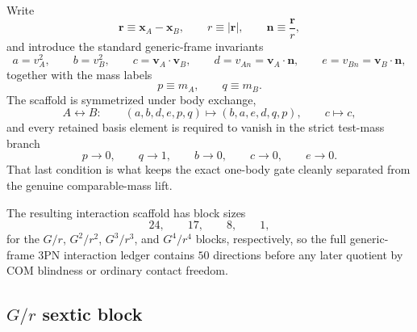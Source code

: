 \documentclass[11pt]{article}
\begin{document}
Write
\begin{equation}
\mathbf r\equiv \mathbf x_A-\mathbf x_B,
\qquad
r\equiv |\mathbf r|,
\qquad
\mathbf n\equiv \frac{\mathbf r}{r},
\label{eq:app-generic-scaffold-rn}
\end{equation}
and introduce the standard generic-frame invariants
\begin{equation}
 a=v_A^2,
 \qquad
 b=v_B^2,
 \qquad
 c=\mathbf v_A\!\cdot\!\mathbf v_B,
 \qquad
 d=v_{An}=\mathbf v_A\!\cdot\!\mathbf n,
 \qquad
 e=v_{Bn}=\mathbf v_B\!\cdot\!\mathbf n,
\label{eq:app-generic-scaffold-invariants}
\end{equation}
together with the mass labels
\begin{equation}
 p\equiv m_A,
 \qquad
 q\equiv m_B.
\label{eq:app-generic-scaffold-masses}
\end{equation}
The scaffold is symmetrized under body exchange,
\begin{equation}
A\leftrightarrow B:
\qquad
(a,b,d,e,p,q)\mapsto(b,a,e,d,q,p),
\qquad
c\mapsto c,
\label{eq:app-generic-scaffold-exchange}
\end{equation}
and every retained basis element is required to vanish in the strict test-mass
 branch
\begin{equation}
 p\to 0,
 \qquad
 q\to 1,
 \qquad
 b\to 0,
 \qquad
 c\to 0,
 \qquad
 e\to 0.
\label{eq:app-generic-scaffold-testmass-branch}
\end{equation}
That last condition is what keeps the exact one-body gate cleanly separated from
 the genuine comparable-mass lift.

The resulting interaction scaffold has block sizes
\begin{equation}
24,
\qquad
17,
\qquad
8,
\qquad
1,
\label{eq:app-generic-scaffold-block-counts}
\end{equation}
for the $G/r$, $G^2/r^2$, $G^3/r^3$, and $G^4/r^4$ blocks, respectively, so the
 full generic-frame $3$PN interaction ledger contains $50$ directions before any
 later quotient by COM blindness or ordinary contact freedom.

\subsection{\texorpdfstring{$G/r$}{G/r} sextic block}
\label{app:generic-scaffold-gr}
\end{document}
